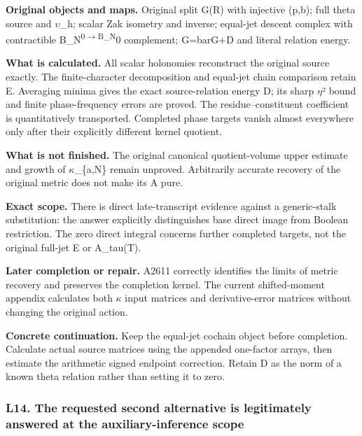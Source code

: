 \textbf{Original objects and maps.} Original split G(R) with injective
(p,b); full theta source and
\allowbreak{}\ensuremath{υ}\allowbreak{}\_h; scalar Zak isometry and
inverse; equal-jet descent complex with contractible
B\_N\textsuperscript{0\allowbreak{}\ensuremath{→}\allowbreak{}B\_N}0
complement; G=barG+D and literal relation energy.

\textbf{What is calculated.} All scalar holonomies reconstruct the
original source exactly. The finite-character decomposition and
equal-jet chain comparison retain E. Averaging minima gives the exact
source-relation energy D; its sharp
\allowbreak{}\ensuremath{η}\allowbreak{}² bound and finite
phase-frequency errors are proved. The residue--constituent coefficient
is quantitatively transported. Completed phase targets vanish almost
everywhere only after their explicitly different kernel quotient.

\textbf{What is not finished.} The original canonical quotient-volume
upper estimate and growth of
\allowbreak{}\ensuremath{κ}\allowbreak{}\_\{a,N\} remain unproved.
Arbitrarily accurate recovery of the original metric does not make its A
pure.

\textbf{Exact scope.} There is direct late-transcript evidence against a
generic-stalk substitution: the answer explicitly distinguishes base
direct image from Boolean restriction. The zero direct integral concerns
further completed targets, not the original full-jet E or A\_tau(T).

\textbf{Later completion or repair.} A2611 correctly identifies the
limits of metric recovery and preserves the completion kernel. The
current shifted-moment appendix calculates both
\allowbreak{}\ensuremath{κ}\allowbreak{} input matrices and
derivative-error matrices without changing the original action.

\textbf{Concrete continuation.} Keep the equal-jet cochain object before
completion. Calculate actual source matrices using the appended
one-factor arrays, then estimate the arithmetic signed endpoint
correction. Retain D as the norm of a known theta relation rather than
setting it to zero.

\subsubsection{L14. The requested second alternative is legitimately
answered at the auxiliary-inference
scope}\label{l14.-the-requested-second-alternative-is-legitimately-answered-at-the-auxiliary-inference-scope}

